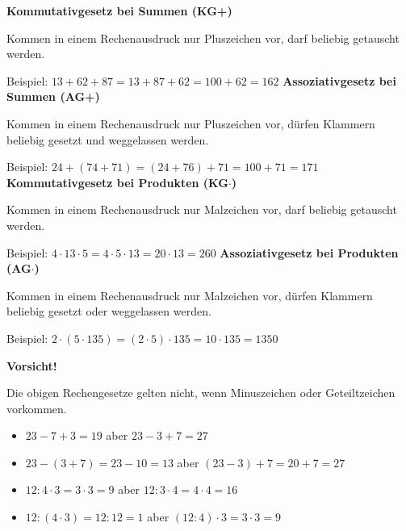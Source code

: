 \documentclass[parskip=half-,a5paper]{scrartcl}
\begin{document}
\begin{tasks}
	\task \textbf{Kommutativgesetz bei Summen (KG+)}

	Kommen in einem Rechenausdruck nur Pluszeichen vor, darf beliebig getauscht
	werden.

	Beispiel: $13+62+87 = 13+87+62 = 100 + 62 = 162$
	\task \textbf{Assoziativgesetz bei Summen (AG+)}

	Kommen in einem Rechenausdruck nur Pluszeichen vor, dürfen Klammern beliebig
	gesetzt und weggelassen werden.

	Beispiel: $24+(74+71) = (24+76)+71 = 100 + 71 = 171$
	\task \textbf{Kommutativgesetz bei Produkten (KG$\cdot$)}

	Kommen in einem Rechenausdruck nur Malzeichen vor, darf beliebig getauscht
	werden.

	Beispiel: $4\cdot 13 \cdot 5= 4 \cdot 5 \cdot 13 = 20 \cdot 13 = 260$
	\task \textbf{Assoziativgesetz bei Produkten (AG$\cdot$)}

	Kommen in einem Rechenausdruck nur Malzeichen vor, dürfen Klammern beliebig
	gesetzt oder weggelassen werden.

	Beispiel: $2\cdot (5 \cdot 135)=(2\cdot 5)\cdot 135 = 10\cdot 135 =1350$
\end{tasks}

\textbf{\large Vorsicht!}

Die obigen Rechengesetze gelten nicht, wenn Minuszeichen oder Geteiltzeichen
vorkommen.
\begin{itemize}
	\item $23-7+3=19$ aber $23-3+7=27$
	\item $23-(3+7)=23-10=13$ aber $(23-3)+7=20+7=27$
	\item $12:4\cdot 3 = 3 \cdot 3 = 9$ aber $12 : 3 \cdot 4 = 4 \cdot 4 = 16$
	\item $12:(4 \cdot 3) = 12 : 12 = 1$ aber $(12:4)\cdot 3 = 3\cdot 3 = 9$
\end{itemize}

\end{document}
